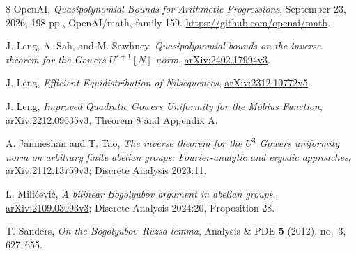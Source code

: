 \documentclass[11pt,a4paper]{article}
\theoremstyle{definition}
\begin{document}
\begin{thebibliography}{8}
\small
{}
OpenAI, \emph{Quasipolynomial Bounds for Arithmetic
Progressions}, September 23, 2026, 198 pp.,
OpenAI/math, family 159.
\url{https://github.com/openai/math}.

J. Leng, A. Sah, and M. Sawhney,
\emph{Quasipolynomial bounds on the inverse theorem
for the Gowers \(U^{s+1}[N]\)-norm},
\href{https://arxiv.org/abs/2402.17994v3}{arXiv:2402.17994v3}.

J. Leng, \emph{Efficient Equidistribution of Nilsequences},
\href{https://arxiv.org/abs/2312.10772v5}{arXiv:2312.10772v5}.

J. Leng, \emph{Improved Quadratic Gowers Uniformity
for the M\"obius Function},
\href{https://arxiv.org/abs/2212.09635v3}{arXiv:2212.09635v3},
Theorem 8 and Appendix A.

A. Jamneshan and T. Tao,
\emph{The inverse theorem for the \(U^3\) Gowers
uniformity norm on arbitrary finite abelian groups:
Fourier-analytic and ergodic approaches},
\href{https://arxiv.org/abs/2112.13759v3}{arXiv:2112.13759v3};
Discrete Analysis 2023:11.

L. Mili\'cevi\'c, \emph{A bilinear Bogolyubov argument
in abelian groups},
\href{https://arxiv.org/abs/2109.03093v3}{arXiv:2109.03093v3};
Discrete Analysis 2024:20, Proposition 28.

T. Sanders, \emph{On the Bogolyubov--Ruzsa lemma},
Analysis \& PDE \textbf{5} (2012), no.~3, 627--655.
\end{thebibliography}
\end{document}
